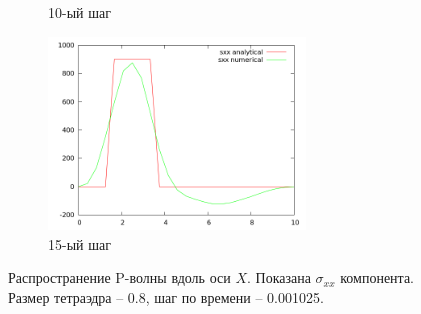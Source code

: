 \begin{figure}[H]
\begin{subfigure}[b]{0.5\textwidth}
\caption{10-ый шаг}
\end{subfigure}
\begin{subfigure}[b]{0.5\textwidth}
\centering
\includegraphics[width=0.75\textwidth]{png/veryfication/0.8/p-wave-along-x15.png}
\caption{15-ый шаг}
\end{subfigure}
\caption{Распространение P-волны вдоль оси $X$. Показана $\sigma_{xx}$ компонента. Размер тетраэдра -- 0.8, шаг по времени -- 0.001025. }
\label{pic:p_wave_along_x8}
\end{figure}

